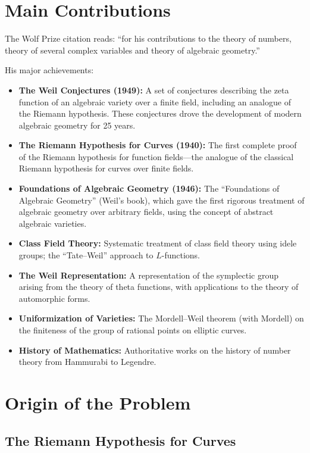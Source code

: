 \section{Main Contributions}

The Wolf Prize citation reads: ``for his contributions to the theory of numbers, theory of several complex variables and theory of algebraic geometry.''

His major achievements:

\begin{itemize}
    \item \textbf{The Weil Conjectures (1949):} A set of conjectures describing the zeta function of an algebraic variety over a finite field, including an analogue of the Riemann hypothesis. These conjectures drove the development of modern algebraic geometry for 25 years.
    \item \textbf{The Riemann Hypothesis for Curves (1940):} The first complete proof of the Riemann hypothesis for function fields---the analogue of the classical Riemann hypothesis for curves over finite fields.
    \item \textbf{Foundations of Algebraic Geometry (1946):} The ``Foundations of Algebraic Geometry'' (Weil's book), which gave the first rigorous treatment of algebraic geometry over arbitrary fields, using the concept of abstract algebraic varieties.
    \item \textbf{Class Field Theory:} Systematic treatment of class field theory using idele groups; the ``Tate--Weil'' approach to $L$-functions.
    \item \textbf{The Weil Representation:} A representation of the symplectic group arising from the theory of theta functions, with applications to the theory of automorphic forms.
    \item \textbf{Uniformization of Varieties:} The Mordell--Weil theorem (with Mordell) on the finiteness of the group of rational points on elliptic curves.
    \item \textbf{History of Mathematics:} Authoritative works on the history of number theory from Hammurabi to Legendre.
\end{itemize}

\section{Origin of the Problem}

\subsection{The Riemann Hypothesis for Curves}

